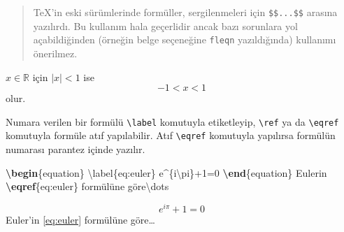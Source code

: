\documentclass[
  10pt,
]{scrbook}
\newenvironment{Shaded}{\begin{snugshade}}{\end{snugshade}}
\newcommand{\ExtensionTok}[1]{#1}
\newcommand{\FunctionTok}[1]{\textcolor[rgb]{0.00,0.00,0.00}{#1}}
\newcommand{\KeywordTok}[1]{\textcolor[rgb]{0.13,0.29,0.53}{\textbf{#1}}}
\newcommand{\NormalTok}[1]{#1}
\newcommand{\SpecialCharTok}[1]{\textcolor[rgb]{0.00,0.00,0.00}{#1}}
\newcommand{\SpecialStringTok}[1]{\textcolor[rgb]{0.31,0.60,0.02}{#1}}
\theoremstyle{definition}
\theoremstyle{definition}
\theoremstyle{definition}
\theoremstyle{definition}
\theoremstyle{remark}
\begin{document}
\begin{quote}
TeX'in eski sürümlerinde formüller, sergilenmeleri için \texttt{\$\$...\$\$} arasına yazılırdı. Bu kullanım hala geçerlidir ancak bazı sorunlara yol açabildiğinden (örneğin belge seçeneğine \texttt{fleqn} yazıldığında) kullanımı önerilmez.
\end{quote}

\begin{Shaded}
\end{Shaded}

\(x\in\mathbb{R}\) için \(|x|<1\) ise \begin{equation*}
 -1<x<1
\end{equation*} olur.

Numara verilen bir formülü \texttt{\textbackslash{}label} komutuyla etiketleyip, \texttt{\textbackslash{}ref} ya da \texttt{\textbackslash{}eqref} komutuyla formüle atıf yapılabilir. Atıf \texttt{\textbackslash{}eqref} komutuyla yapılırsa formülün numarası parantez içinde yazılır.

\begin{Shaded}
\begin{Highlighting}[]
\KeywordTok{\textbackslash{}begin}\NormalTok{\{}\ExtensionTok{equation}\NormalTok{\}}
\SpecialCharTok{\textbackslash{}label}\SpecialStringTok{\{eq:euler\}}
\SpecialStringTok{  e\^{}\{i}\SpecialCharTok{\textbackslash{}pi}\SpecialStringTok{\}+1=0}
\KeywordTok{\textbackslash{}end}\NormalTok{\{}\ExtensionTok{equation}\NormalTok{\}}
\NormalTok{Euler\textquotesingle{}in }\KeywordTok{\textbackslash{}eqref}\NormalTok{\{}\ExtensionTok{eq:euler}\NormalTok{\} formülüne göre}\FunctionTok{\textbackslash{}dots}
\end{Highlighting}
\end{Shaded}

\begin{equation}
 e^{i\pi}+1=0
 \label{eq:euler}
\end{equation} Euler'in \eqref{eq:euler} formülüne göre\ldots{}
\end{document}
